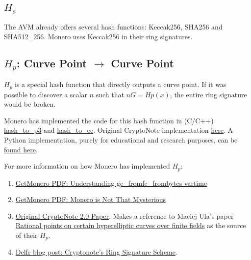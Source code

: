 \documentclass[9pt]{article}
\begin{document}
\subsection{$H_s$}

The AVM already offers several hash functions: Keccak256, SHA256 and SHA512\_256. Monero uses Keccak256 in their ring signatures.

\subsection{$H_p$: Curve Point $\rightarrow$ Curve Point}

$H_p$ is a special hash function that directly outputs a curve point. If it was possible to discover a scalar $n$ such that $n G = Hp(x)$, the entire ring signature would be broken.

Monero has implemented the code for this hash function in (C/C++) \href{https://github.com/monero-project/monero/blob/master/src/ringct/rctOps.cpp#L654}{hash\_to\_p3} and \href{https://github.com/monero-project/monero/blob/master/src/crypto/crypto.cpp#L611}{hash\_to\_ec}. Original CryptoNote implementation \href{https://github.com/cryptonotefoundation/cryptonote/blob/8edd998304431c219b432194b7a3847b44b576c3/src/crypto/crypto.cpp#L329-L389}{here}. A Python implementation, purely for educational and research purposes, can be \href{https://github.com/monero-project/mininero/blob/master/mininero.py#L238}{found here}.

For more information on how Monero has implemented $H_p$:
\begin{enumerate}
    \item \href{https://web.getmonero.org/zh-tw/resources/research-lab/pubs/ge_fromfe.pdf}{GetMonero PDF: Understanding ge\_fromfe\_frombytes vartime}
    \item \href{https://web.getmonero.org/resources/research-lab/pubs/MRL-0003.pdf}{GetMonero PDF: Monero is Not That Mysterious}
    \item \href{https://www.researchhub.com/paper/821786/monero-cryptonote-v-20}{Original CryptoNote 2.0 Paper}. Makes a reference to Maciej Ula's paper \href{http://arxiv.org/abs/0706.1448}{Rational points on certain hyperelliptic curves over finite fields} as the source of their $H_p$.
    \item \href{https://delfr.com/cryptonote-ring-signature/}{Delfr blog post: Cryptonote's Ring Signature Scheme}. 
\end{enumerate}
\end{document}
